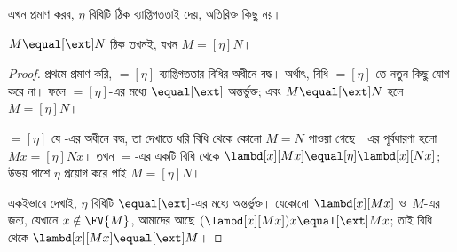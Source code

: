 \documentclass[../../../include/open-logic-section]{subfiles}
\begin{document}
এখন প্রমাণ করব, $\eta$ বিধিটি ঠিক ব্যাপ্তিগততাই দেয়, অতিরিক্ত কিছু
নয়।

\begin{thm}
  $M \equal[\ext] N$ ঠিক তখনই, যখন $M \equal[\eta] N$।
\end{thm}

\begin{proof}
  প্রথমে প্রমাণ করি, $\equal[\eta]$ ব্যাপ্তিগততার বিধির অধীনে বদ্ধ।
  অর্থাৎ, \ext{} বিধি $\equal[\eta]$-তে নতুন কিছু যোগ করে না। ফলে
  $\equal[\eta]$-এর মধ্যে $\equal[\ext]$ অন্তর্ভুক্ত; এবং
  $M \equal[\ext] N$ হলে $M \equal[\eta] N$।

  $\equal[\eta]$ যে \ext-এর অধীনে বদ্ধ, তা দেখাতে ধরি \ext{} বিধি
  থেকে কোনো $M \equal N$ পাওয়া গেছে। এর পূর্বধারণা হলো
  $Mx \equal[\eta] Nx$। তখন $\equal$-এর একটি বিধি থেকে
  $\lambd[x][Mx] \equal[\eta] \lambd[x][Nx]$; উভয় পাশে $\eta$
  প্রয়োগ করে পাই $M \equal[\eta] N$।

  একইভাবে দেখাই, $\eta$ বিধিটি $\equal[\ext]$-এর মধ্যে অন্তর্ভুক্ত।
  যেকোনো $\lambd[x][Mx]$ ও~$M$-এর জন্য, যেখানে $x \notin
  \FV{M}$, আমাদের আছে $(\lambd[x][Mx])x \equal[\ext] Mx$; তাই
  \ext{} বিধি থেকে $\lambd[x][Mx] \equal[\ext] M$।
\end{proof}
\end{document}
